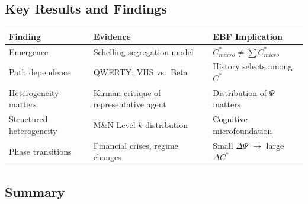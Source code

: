 \subsection{Key Results and Findings}
\label{sec:ag-results}


\begin{center}
\renewcommand{\arraystretch}{1.3}
\begin{tabular}{@{}p{4cm}p{5.5cm}p{4cm}@{}}
\toprule
\textbf{Finding} & \textbf{Evidence} & \textbf{EBF Implication} \\
\midrule
Emergence & Schelling segregation model & $C^*_{macro} \neq \sum C^*_{micro}$ \\
Path dependence & QWERTY, VHS vs.\ Beta & History selects among $C^*$ \\
Heterogeneity matters & Kirman critique of representative agent & Distribution of $\Psi$ matters \\
Structured heterogeneity & M\&N Level-$k$ distribution & Cognitive microfoundation \\
Phase transitions & Financial crises, regime changes & Small $\Delta\Psi$ $\to$ large $\Delta C^*$ \\
\bottomrule
\end{tabular}
\end{center}


\subsection{Summary}


